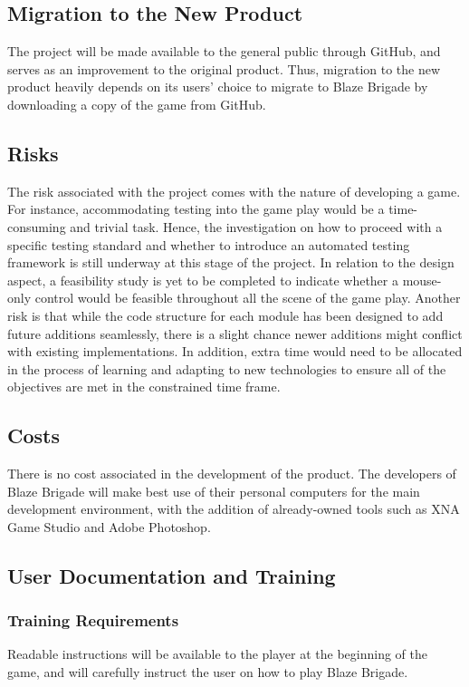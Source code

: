 \documentclass{article}
\begin{document}
\subsection{Migration to the New Product}
The project will be made available to the general public through GitHub, and serves as an improvement to the original product. Thus, migration to the new product heavily depends on its users' choice to migrate to Blaze Brigade by downloading a copy of the game from GitHub.

\subsection{Risks}
The risk associated with the project comes with the nature of developing a game. For instance, accommodating testing into the game play would be a time-consuming and trivial task. Hence, the investigation on how to proceed with a specific testing standard and whether to introduce an automated testing framework is still underway at this stage of the project. In relation to the design aspect, a feasibility study is yet to be completed to indicate whether a mouse-only control would be feasible throughout all the scene of the game play. Another risk is that while the code structure for each module has been designed to add future additions seamlessly, there is a slight chance newer additions might conflict with existing implementations. In addition, extra time would need to be allocated in the process of learning and adapting to new technologies to ensure all of the objectives are met in the constrained time frame.

\subsection{Costs}
There is no cost associated in the development of the product. The developers of Blaze Brigade will make best use of their personal computers for the main development environment, with the addition of already-owned tools such as XNA Game Studio and Adobe Photoshop.

\subsection{User Documentation and Training}

\subsubsection{Training Requirements}
Readable instructions will be available to the player at the beginning of the game, and will carefully instruct the user on how to play Blaze Brigade. 
\end{document}
